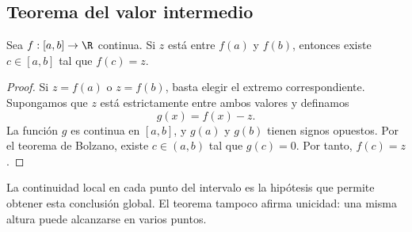 \subsection{Teorema del valor intermedio}

\begin{teorema}
Sea \(f:[a,b]\to\R\) continua. Si \(z\) está entre \(f(a)\) y \(f(b)\),
entonces existe \(c\in[a,b]\) tal que \(f(c)=z\).
\end{teorema}

\begin{proof}
Si \(z=f(a)\) o \(z=f(b)\), basta elegir el extremo correspondiente.
Supongamos que \(z\) está estrictamente entre ambos valores y definamos
\[
  g(x)=f(x)-z.
\]
La función \(g\) es continua en \([a,b]\), y \(g(a)\) y \(g(b)\) tienen
signos opuestos. Por el teorema de Bolzano, existe \(c\in(a,b)\) tal que
\(g(c)=0\). Por tanto, \(f(c)=z\).
\end{proof}

La continuidad local en cada punto del intervalo es la hipótesis que permite
obtener esta conclusión global. El teorema tampoco afirma unicidad: una misma
altura puede alcanzarse en varios puntos.
